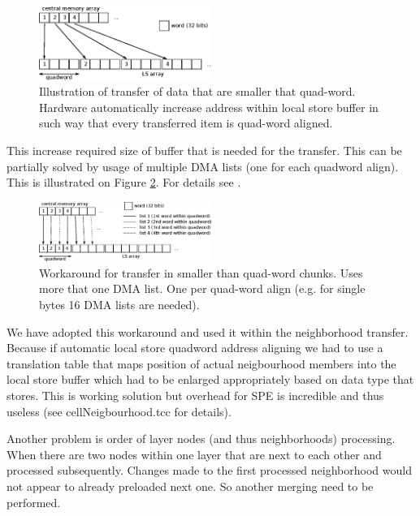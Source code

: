 \begin{figure}
    \centering
    \includegraphics[width=0.5\textwidth]{data/automaticAlignOfSmallData}
    \caption[automatic align of small data]
{
  Illustration of transfer of data that are smaller that quad-word.
  Hardware automatically increase address within local store buffer in such way that every transferred item is quad-word aligned.
}
    \label{fg:automaticAlignOfSmallData}
\end{figure}

This increase required size of buffer that is needed for the transfer.
This can be partially solved by usage of multiple DMA lists (one for each quadword align).
This is illustrated on Figure \ref{fg:multipleDMAList}.
For details see \cite{DMAListIssues}.

\begin{figure}
    \centering
    \includegraphics[width=0.5\textwidth]{data/multipleDMAList}
    \caption[multiple DMA list workaround]
{
  Workaround for transfer in smaller than quad-word chunks.
  Uses more that one DMA list.
  One per quad-word align (e.g. for single bytes 16 DMA lists are needed).
}
    \label{fg:multipleDMAList}
\end{figure}

We have adopted this workaround and used it within the neighborhood transfer.
Because if automatic local store quadword address aligning we had to use a translation table that maps position of actual neigbourhood members into the local store buffer which had to be enlarged appropriately based on data type that stores.
This is working solution but overhead for SPE is incredible and thus useless (see cellNeigbourhood.tcc for details).

\par
\label{neighbourhoodDependecy}
Another problem is order of layer nodes (and thus neighborhoods) processing.
When there are two nodes within one layer that are next to each other and processed subsequently.
Changes made to the first processed neighborhood would not appear to already preloaded next one.
So another merging need to be performed.

